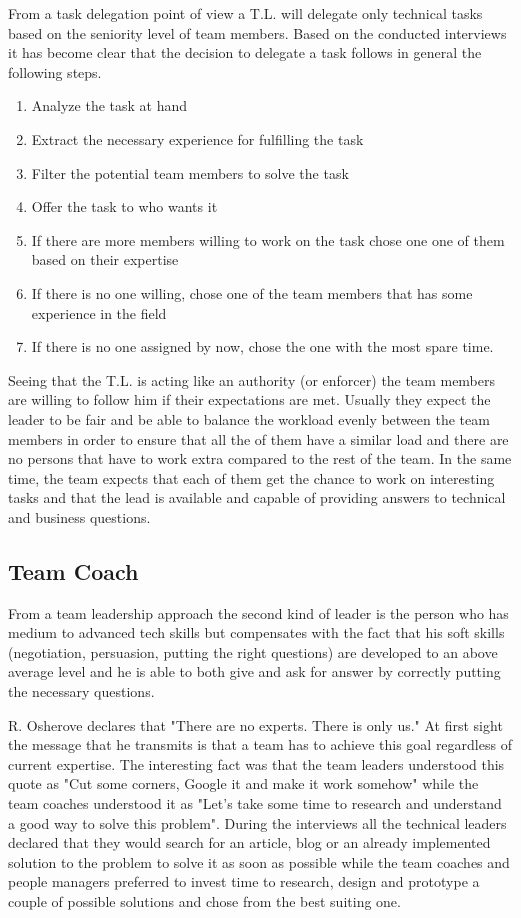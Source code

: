 From a task delegation point of view a T.L. will delegate only technical tasks based on the seniority level of team members. Based on the conducted interviews it has become clear that the decision to delegate a task follows in general the following steps.
\begin{enumerate}
\item Analyze the task at hand
\item Extract the necessary experience for fulfilling the task
\item Filter the potential team members to solve the task
\item Offer the task to who wants it
\item If there are more members willing to work on the task chose one one of them based on their expertise
\item If there is no one willing, chose one of the team members that has some experience in the field
\item If there is no one assigned by now, chose the one with the most spare time.
\end{enumerate}

Seeing that the T.L. is acting like an authority (or enforcer) the team members are willing to follow him if their expectations are met. Usually they expect the leader to be fair and be able to balance the workload evenly between the team members in order to ensure that all the of them have a similar load and there are no persons that have to work extra compared to the rest of the team. In the same time, the team expects that each of them get the chance to work on interesting tasks and that the lead is available and capable of providing answers to technical and business questions.

\subsection{Team Coach}
\label{sub-sec:team-coach}
From a team leadership approach the second kind of leader is the person who has medium to advanced tech skills but compensates with the fact that his soft skills (negotiation, persuasion, putting the right questions) are developed to an above average level and he is able to both give and ask for answer by correctly putting the necessary questions.

R. Osherove \cite{notes-to-a-software-team-leader} declares that "There are no experts. There is only us." At first sight the message that he transmits is that a team has to achieve this goal regardless of current expertise. The interesting fact was that the team leaders understood this quote as "Cut some corners, Google it and make it work somehow" while the team coaches understood it as "Let's take some time to research and understand a good way to solve this problem". During the interviews all the technical leaders declared that they would search for an article, blog or an already implemented solution to the problem to solve it as soon as possible while the team coaches and people managers preferred to invest time to research, design and prototype a couple of possible solutions and chose from the best suiting one.


